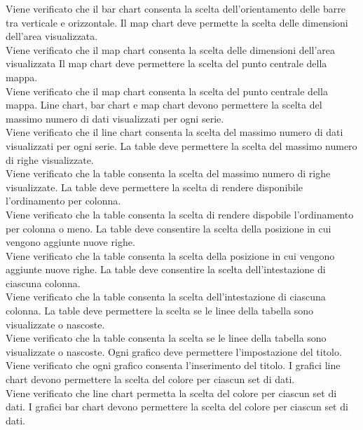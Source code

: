 Viene verificato che il bar chart consenta la scelta dell'orientamento delle barre tra verticale e orizzontale.
 Il map chart deve permette la scelta delle dimensioni dell'area visualizzata.\\
Viene verificato che il map chart consenta la scelta delle dimensioni dell'area visualizzata
	Il map chart deve permettere la scelta del punto centrale della mappa.\\
Viene verificato che il map chart consenta la scelta del punto centrale della mappa.
	Line chart, bar chart e map chart devono permettere la scelta del massimo numero di dati visualizzati per ogni serie.\\
Viene verificato che il line chart consenta la scelta del massimo numero di dati visualizzati per ogni serie.
	La table deve permettere la scelta del massimo numero di righe visualizzate.\\
Viene verificato che la table consenta la scelta del massimo numero di righe visualizzate.
	La table deve permettere la scelta di rendere disponibile l'ordinamento per colonna.\\
Viene verificato che la table consenta la scelta di rendere dispobile l'ordinamento per colonna o meno.
	La table deve consentire la scelta della posizione in cui vengono aggiunte nuove righe.\\
Viene verificato che la table consenta la scelta della posizione in cui vengono aggiunte nuove righe.
 La table deve consentire la scelta dell'intestazione di ciascuna colonna.\\
Viene verificato che la table consenta la scelta dell'intestazione di ciascuna colonna.
	La table deve permettere la scelta se le linee della tabella sono visualizzate o nascoste.\\
Viene verificato che la table consenta la scelta se le linee della tabella sono visualizzate o nascoste.
	Ogni grafico deve permettere l'impostazione del titolo.\\
Viene verificato che ogni grafico consenta l'inserimento del titolo.
	I grafici line chart devono permettere la scelta del colore per ciascun set di dati.\\
Viene verificato che line chart permetta la scelta del colore per ciascun set di dati.
	 I grafici bar chart devono permettere la scelta del colore per ciascun set di dati.\\
